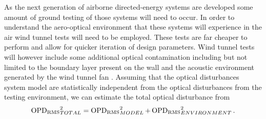 As the next generation of airborne directed-energy systems are developed some amount of ground testing of those systems will need to occur.
In order to understand the aero-optical environment that these systems will experience in the air wind tunnel tests will need to be employed.
These tests are far cheaper to perform and allow for quicker iteration of design parameters.
Wind tunnel tests will however include some additional optical contamination including but not limited to the boundary layer present on the wall and the acoustic environment generated by the wind tunnel fan \cite{Gordeyev-2014-jcJndkHM}.
Assuming that the optical disturbances system model are statistically independent from the optical disturbances from the testing environment, we can estimate the total optical disturbance from
\begin{equation}
  \operatorname{OPD_{RMS}}_{TOTAL}^2 = \operatorname{OPD_{RMS}}_{MODEL}^2+\operatorname{OPD_{RMS}}_{ENVIRONMENT}^2 \textrm{.}
  \label{eqn:01_combined_opd}
\end{equation}

